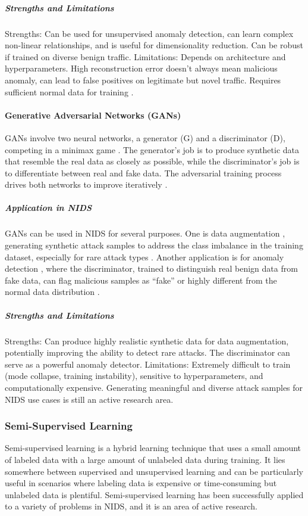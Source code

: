 \subparagraph{Strengths and Limitations}
\noindent Strengths: Can be used for unsupervised anomaly detection, can learn complex non-linear relationships, and is useful for dimensionality reduction. Can be robust if trained on diverse benign traffic.
Limitations: Depends on architecture and hyperparameters. High reconstruction error doesn't always mean malicious anomaly, can lead to false positives on legitimate but novel traffic. Requires sufficient normal data for training \parencite{said2023systematic}.

\paragraph{Generative Adversarial Networks (GANs)}
\noindent GANs involve two neural networks, a generator (G) and a discriminator (D), competing in a minimax game \parencite{goodfellow2014generative}. The generator's job is to produce synthetic data that resemble the real data as closely as possible, while the discriminator's job is to differentiate between real and fake data. The adversarial training process drives both networks to improve iteratively \parencite{elsayed2021survey}.


\subparagraph{Application in NIDS} 
GANs can be used in NIDS for several purposes. One is data augmentation , generating synthetic attack samples to address the class imbalance in the training dataset, especially for rare attack types \parencite {kim2021adversarial}. Another application is for anomaly detection , where the discriminator, trained to distinguish real benign data from fake data, can flag malicious samples as “fake” or highly different from the normal data distribution \parencite {liu2023intrusion}.

\subparagraph{Strengths and Limitations} 
Strengths: Can produce highly realistic synthetic data for data augmentation, potentially improving the ability to detect rare attacks. The discriminator can serve as a powerful anomaly detector.
Limitations: Extremely difficult to train (mode collapse, training instability), sensitive to hyperparameters, and computationally expensive. Generating meaningful and diverse attack samples for NIDS use cases is still an active research area.

\subsubsection{Semi-Supervised Learning} 
Semi-supervised learning is a hybrid learning technique that uses a small amount of labeled data with a large amount of unlabeled data during training. It lies somewhere between supervised and unsupervised learning and can be particularly useful in scenarios where labeling data is expensive or time-consuming but unlabeled data is plentiful. Semi-supervised learning has been successfully applied to a variety of problems in NIDS, and it is an area of active research.

